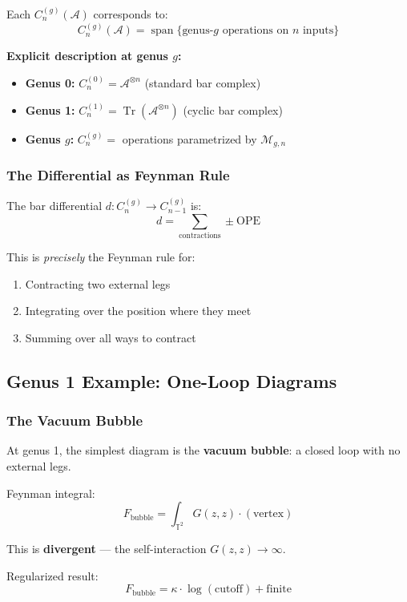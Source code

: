 Each $C_n^{(g)}(\mathcal{A})$ corresponds to:
$$C_n^{(g)}(\mathcal{A}) = \operatorname{span}\{ \text{genus-}g\text{ operations on }n\text{ inputs} \}$$

\textbf{Explicit description at genus $g$:}
\begin{itemize}
\item \textbf{Genus 0:} $C_n^{(0)} = \mathcal{A}^{\otimes n}$ (standard bar complex)

\item \textbf{Genus 1:} $C_n^{(1)} = \operatorname{Tr}(\mathcal{A}^{\otimes n})$
(cyclic bar complex)

\item \textbf{Genus $g$:} $C_n^{(g)} = $ operations parametrized by $\mathcal{M}_{g,n}$
\end{itemize}

\subsubsection{The Differential as Feynman Rule}

The bar differential $d: C_n^{(g)} \to C_{n-1}^{(g)}$ is:
$$d = \sum_{\text{contractions}} \pm \text{OPE}$$

This is \emph{precisely} the Feynman rule for:
\begin{enumerate}
\item Contracting two external legs
\item Integrating over the position where they meet
\item Summing over all ways to contract
\end{enumerate}

\subsection{Genus 1 Example: One-Loop Diagrams}

\subsubsection{The Vacuum Bubble}

At genus 1, the simplest diagram is the \textbf{vacuum bubble}: a closed loop with no external legs.

Feynman integral:
$$F_{\text{bubble}} = \int_{\mathbb{T}^2} G(z, z) \cdot (\text{vertex})$$

This is \textbf{divergent} --- the self-interaction $G(z,z) \to \infty$.

Regularized result:
$$F_{\text{bubble}} = \kappa \cdot \log(\text{cutoff}) + \text{finite}$$

